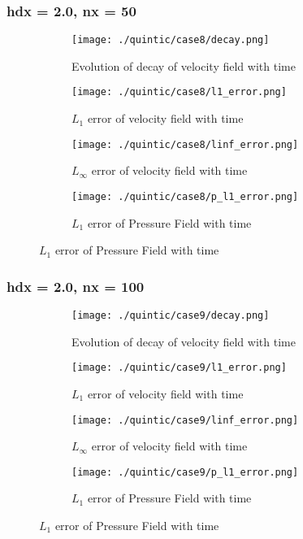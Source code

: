 \documentclass[11pt, a4paper]{article}
\begin{document}
\subsubsection{hdx = 2.0, nx = 50}
\begin{figure}[H]
\begin{subfigure}{0.48\textwidth}
\texttt{[image: ./quintic/case8/decay.png]}
\caption{Evolution of decay of velocity field with time}
\end{subfigure}
\begin{subfigure}{0.48\textwidth}
\texttt{[image: ./quintic/case8/l1\_error.png]}
\caption{$L_1$ error of velocity field with time}
\end{subfigure}
\medskip
\begin{subfigure}{0.48\textwidth}
\texttt{[image: ./quintic/case8/linf\_error.png]}
\caption{$L_\infty$ error of velocity field with time}
\end{subfigure}
\begin{subfigure}{0.48\textwidth}
\texttt{[image: ./quintic/case8/p\_l1\_error.png]}
\caption{$L_1$ error of Pressure Field with time}
\end{subfigure}
\end{figure}

\subsubsection{hdx = 2.0, nx = 100}
\begin{figure}[H]
\begin{subfigure}{0.48\textwidth}
\texttt{[image: ./quintic/case9/decay.png]}
\caption{Evolution of decay of velocity field with time}
\end{subfigure}
\begin{subfigure}{0.48\textwidth}
\texttt{[image: ./quintic/case9/l1\_error.png]}
\caption{$L_1$ error of velocity field with time}
\end{subfigure}
\medskip
\begin{subfigure}{0.48\textwidth}
\texttt{[image: ./quintic/case9/linf\_error.png]}
\caption{$L_\infty$ error of velocity field with time}
\end{subfigure}
\begin{subfigure}{0.48\textwidth}
\texttt{[image: ./quintic/case9/p\_l1\_error.png]}
\caption{$L_1$ error of Pressure Field with time}
\end{subfigure}
\end{figure}
\end{document}
